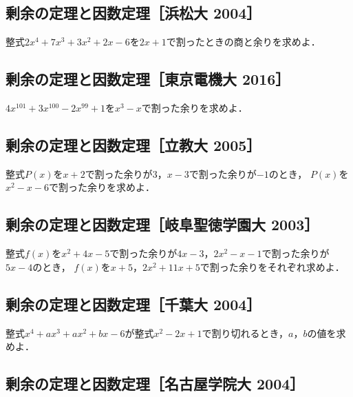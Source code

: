\documentclass[../all/math-standard_questions_all.tex]{subfiles}
\begin{document}
\subsection{剰余の定理と因数定理［浜松大 2004］}

整式$2x^4+7x^3+3x^2+2x-6$を$2x+1$で割ったときの商と余りを求めよ．

\vspace{2cm}
\vfill

\subsection{剰余の定理と因数定理［東京電機大 2016］}

$4x^{101}+3x^{100}-2x^{99}+1$を$x^3-x$で割った余りを求めよ．

\vspace{2cm}
\vfill

\subsection{剰余の定理と因数定理［立教大 2005］}

整式$P(x)$を$x+2$で割った余りが$3$，$x-3$で割った余りが$-1$のとき，
$P(x)$を$x^2- x - 6$で割った余りを求めよ．

\vspace{2cm}
\vfill

\subsection{剰余の定理と因数定理［岐阜聖徳学園大 2003］}

整式$f(x)$を$x^2+4x-5$で割った余りが$4x-3$，$2x^2-x-1$で割った余りが$5x-4$のとき，
$f(x)$を$x+5$，$2x^2+11x+5$で割った余りをそれぞれ求めよ．

\vspace{2cm}
\vfill

\subsection{剰余の定理と因数定理［千葉大 2004］}

整式$x^4+ax^3+ax^2+bx-6$が整式$x^2-2x+1$で割り切れるとき，$a$，$b$の値を求めよ．

\vspace{2cm}
\vfill

\subsection{剰余の定理と因数定理［名古屋学院大 2004］}
\end{document}
